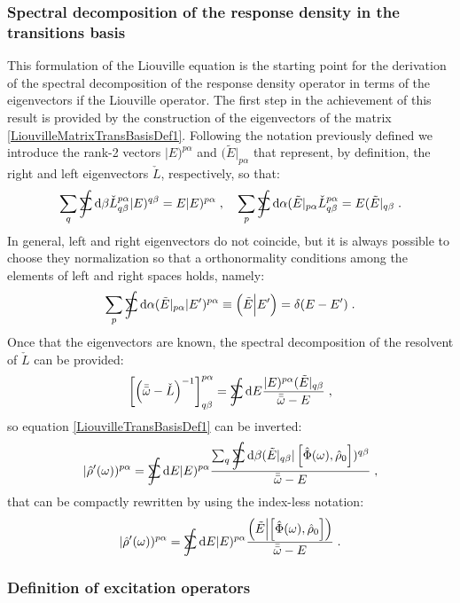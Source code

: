 \documentclass[a4paper]{article}
\newcommand{\dd}{{\rm d}}
\newcommand{\bbomega}{{\bar{\bar\omega}}}
\newcommand{\sint}{\mathrlap{\displaystyle\int}
\mathrlap{\textstyle\sum}
\phantom{\mathrlap{\displaystyle
\int}\textstyle\sum}}
\newcommand{\be}{\begin{equation}}
\newcommand{\ee}{\end{equation}}
\newcommand{\lb}{\label}
\newcommand{\op}[1]{\hat {#1}}
\newcommand{\commutator}[2]{\left[ {#1} , {#2} \right]}
\newcommand{\optr}[1]{\check #1}
\newcommand{\sket}[2]{| #2)^{#1}}
\newcommand{\sbra}[2]{( #2|_{#1}}
\newcommand{\dbraket}[2]{\Bigl(#1 \Bigl| #2 \Bigr)}
\newcommand{\dmnot}{\op{\rho}_0}
\newcommand{\dm}{\op{\rho}}
\begin{document}
\subsubsection{Spectral decomposition of the response density in the transitions basis}

This formulation of the Liouville equation is the starting point for the derivation of the spectral decomposition of the response density operator
in terms of the eigenvectors if the Liouville operator. 
The first step in the achievement of this result is provided by the construction of the eigenvectors of the matrix \eqref{LiouvilleMatrixTransBasisDef1}.
Following the notation previously defined we introduce the rank-2 vectors $\sket{p\alpha}{E}$ and $\sbra{p\alpha}{\tilde E}$ that represent, by definition,
the right and left eigenvectors $\optr{L}$, respectively, so that:
\be\lb{LiouvMatrixEigenvectorDef1}
\sum_q \sint \dd \beta \optr{L}^{p \alpha}_{q\beta} \sket{q \beta}{E} = E \sket{p\alpha}{E} \;, \quad
\sum_p \sint \dd \alpha \sbra{p\alpha}{\tilde E} \optr{L}^{p \alpha}_{q\beta} = E \sbra{q\beta}{\tilde E}\;.
\ee
In general, left and right eigenvectors do not coincide, but it is always possible to choose they normalization so that a orthonormality conditions among the
elements of left and right spaces holds, namely:
\be\lb{ExcitationOrthonormalityDef1}
\sum_p \sint \dd \alpha \sbra{p\alpha}{\tilde E}\sket{p\alpha}{E'} \equiv \dbraket{\tilde E}{E'} = \delta(E-E') \;.
\ee
Once that the eigenvectors are known, the spectral decomposition of the resolvent of $\optr{L}$ can be provided:  
\be
\left[\left(\bbomega-\optr{L}\right)^{-1}\right]^{p\alpha}_{q\beta} =\sint\dd E
\frac{\sket{p\alpha}{E}\sbra{q\beta}{\tilde E}}{\bbomega-E} \;,
\ee
so equation \eqref{LiouvilleTransBasisDef1} can be inverted:
\be\lb{RhopExcitationTransBasisDef1}
\sket{p\alpha}{\dm'(\omega)} = \sint\dd E \sket{p\alpha}{E}
\frac{\sum_q \sint \dd \beta\sbra{q\beta}{\tilde E}
\sket{q\beta}{\commutator{\op\Phi(\omega)}{\dmnot}}}{\bbomega-E} \;,
\ee
that can be compactly rewritten by using the index-less notation:
\be\lb{RhopExcitationTransBasisDef2}
\sket{p\alpha}{\dm'(\omega)} = 
\sint\dd E \sket{p\alpha}{E}
\frac{\dbraket{\tilde E}{\commutator{\op\Phi(\omega)}{\dmnot}}}{\bbomega-E} \;.
\ee

\subsubsection{Definition of excitation operators}
\end{document}
